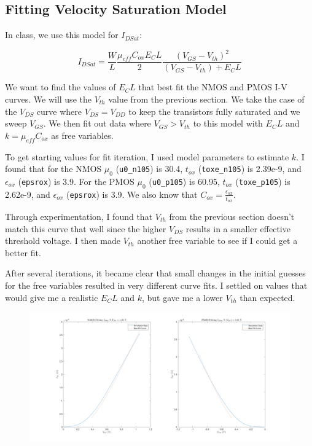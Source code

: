 \documentclass[11pt]{article}
\begin{document}
\subsection{Fitting Velocity Saturation Model}
In class, we use this model for $I_{DSat}$:

\begin{equation*}
	I_{DSat} = \frac{W}{L} \frac{\mu_{eff} C_{ox} E_C L}{2} \frac{(V_{GS} - V_{th})^2}{(V_{GS} - V_{th}) + E_C L}
\end{equation*}

We want to find the values of $E_C L$ that best fit the NMOS and PMOS I-V curves. We will use the $V_{th}$ value from the previous section. We take the case of the $V_{DS}$ curve where $V_{DS} = V_{DD}$ to keep the transistors fully saturated and we sweep $V_{GS}$. We then fit out data where $V_{GS} > V_{th}$ to this model with $E_C L$ and $k = \mu_{eff} C_{ox}$ as free variables.

To get starting values for fit iteration, I used model parameters to estimate $k$. I found that for the NMOS $\mu_0$ (\verb|u0_n105|) is 30.4, $t_{ox}$ (\verb|toxe_n105|) is 2.39e-9, and $\epsilon_{ox}$ (\verb|epsrox|) is 3.9. For the PMOS $\mu_0$ (\verb|u0_p105|) is 60.95, $t_{ox}$ (\verb|toxe_p105|) is 2.62e-9, and $\epsilon_{ox}$ (\verb|epsrox|) is 3.9. We also know that $C_{ox} = \frac{\epsilon_{ox}}{t_{ox}}$.

Through experimentation, I found that $V_{th}$ from the previous section doesn't match this curve that well since the higher $V_{DS}$ results in a smaller effective threshold voltage. I then made $V_{th}$ another free variable to see if I could get a better fit.

After several iterations, it became clear that small changes in the initial guesses for the free variables resulted in very different curve fits. I settled on values that would give me a realistic $E_C L$ and $k$, but gave me a lower $V_{th}$ than expected.

\begin{figure}[H]
	\centerline{\includegraphics[width=\textwidth]{images/idsat_fit.png}}
\end{figure}
\end{document}
